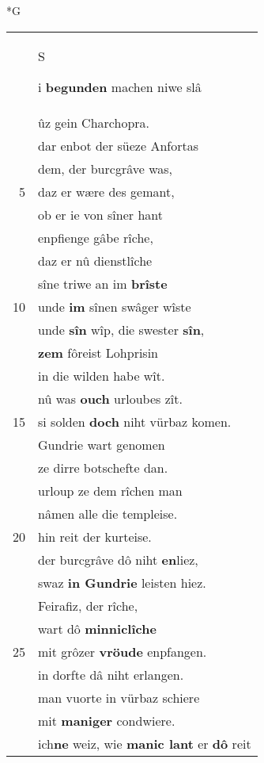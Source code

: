 \documentclass[8pt,a4paper,notitlepage]{article}
\begin{document}
\newpage
\begin{table}[ht]
\begin{minipage}[t]{0.5\linewidth}
\small
\begin{center}*G
\end{center}
\begin{tabular}{rl}
 & \begin{large}S\end{large}i \textbf{begunden} machen niwe slâ\\ 
 & ûz gein Charchopra.\\ 
 & dar enbot der süeze Anfortas\\ 
 & dem, der burcgrâve was,\\ 
5 & daz er wære des gemant,\\ 
 & ob er ie von sîner hant\\ 
 & enpfienge gâbe rîche,\\ 
 & daz er nû dienstlîche\\ 
 & sîne triwe an im \textbf{brîste}\\ 
10 & unde \textbf{im} sînen swâger wîste\\ 
 & unde \textbf{sîn} wîp, die swester \textbf{sîn},\\ 
 & \textbf{zem} fôreist Lohprisin\\ 
 & in die wilden habe wît.\\ 
 & nû was \textbf{ouch} urloubes zît.\\ 
15 & si solden \textbf{doch} niht vürbaz komen.\\ 
 & Gundrie wart genomen\\ 
 & ze dirre botschefte dan.\\ 
 & urloup ze dem rîchen man\\ 
 & nâmen alle die templeise.\\ 
20 & hin reit der kurteise.\\ 
 & der burcgrâve dô niht \textbf{en}liez,\\ 
 & swaz \textbf{in Gundrie} leisten hiez.\\ 
 & Feirafiz, der rîche,\\ 
 & wart dô \textbf{minniclîche}\\ 
25 & mit grôzer \textbf{vröude} enpfangen.\\ 
 & in dorfte dâ niht erlangen.\\ 
 & man vuorte in vürbaz schiere\\ 
 & mit \textbf{maniger} condwiere.\\ 
 & ich\textbf{ne} weiz, wie \textbf{manic lant} er \textbf{dô} reit\\ 

\end{tabular}
\end{minipage}
\end{table}
\end{document}

